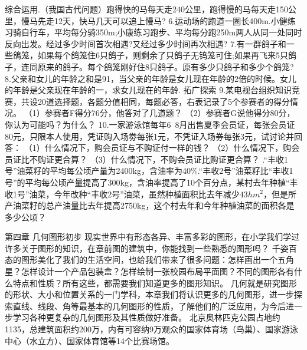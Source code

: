 \documentclass{article}
\begin{document}
\begin{exercise}
综合运用.（我国古代问题）跑得快的马每天走240公里，跑得慢的马每天走150公里，慢马先走12天，快马几天可以追上慢马?\newline
 6.运动场的跑道一圈长400m.小健练习骑自行车，平均每分骑350m;小康练习跑步、平均每分跑250m两人从同一处同时反向出发。经过多少时间首次相遇?又经过多少时间再次相遇?    \newline 7.有一群鸽子和一些鴿笼，如果每个鸽笼住6只鸽子，则剩余了只鸽子无钨笼可住;如果再飞来5只鸽子，连同原来的鸽子。每个鸽笼刚好住8只鸽子。原有多少只鸽子和多少个鸽笼?   \newline  8.父亲和女儿的年龄之和是91，当父亲的年龄是女儿现在年龄的2倍的时候。女儿的年龄是父亲现在年龄的一，求女儿现在的年龄.\newline
 拓广探索   \newline
 9.某电视台组织知识竞赛，共设20道选择题，各题分值相同，每题必答，右表记录了5个参赛者的得分情况。 \newline
 （1）参赛者F得分76分，他答对了几道题？ \newline
 （2）参赛者G说他得分80分，你认为可能吗？为什么？ \newline
 10.一家游泳馆每年6~8月出售夏季会员证，每张会员证80元，只限本人使用，凭证购入场劵每张1元，不凭证入场券每张3元，试讨论并回答： \newline
 （1）什么情况下，购会员证与不购证付一样的钱？ \newline
 （2）什么情况下，购会员证比不购证更合算？ \newline
 （3）什么情况下，不购会员证比购证更合算？ .“丰收1号”油菜籽的平均每公顷产量为2400kg，含油率为40$\%$.“丰收2号”油菜籽比“丰收1号”的平均每公顷产量提高了300kg，含油率提高了10个百分点，某村去年种植“丰收1号”油菜，今年改种“丰收2号”油菜，虽然种植面积比去年减少$43{hm^2}$，但是所产油菜籽的总产油量比去年提高2750kg，这个村去年和今年种植油菜的面积各是多少公顷？ \newline
\end{exercise}

\begin{article}
第四章 几何图形初步\newline
现实世界中有形态各异、丰富多彩的图形，在小学我们学过许多关于图形的知识，在章前图的建筑中，你能找到一些熟悉的图形吗？\newline
千姿百态的图形美化了我们的生活空间，也给我们带来了很多问题：怎样画出一个五角星？怎样设计一个产品包装盒？怎样绘制一张校园布局平面图？不同的图形各有什么特点和性质？所有这些，都需要我们知道更多的图形知识。\newline
几何就是研究图形的形状、大小和位置关系的一门学科，本章我们将认识更多的几何图形，进一步探索直线、线段、角等最基本的几何图形的性质，了解他们的广泛应用，为今后进一步学习各种更复杂的几何图形及其性质做好准备。\newline
北京奥林匹克公园占地约1135，总建筑面积约200万，内有可容纳9万观众的国家体育场（鸟巢）、国家游泳中心（水立方）、国家体育馆等14个比赛场馆。\newline
\end{article}
\end{document}
